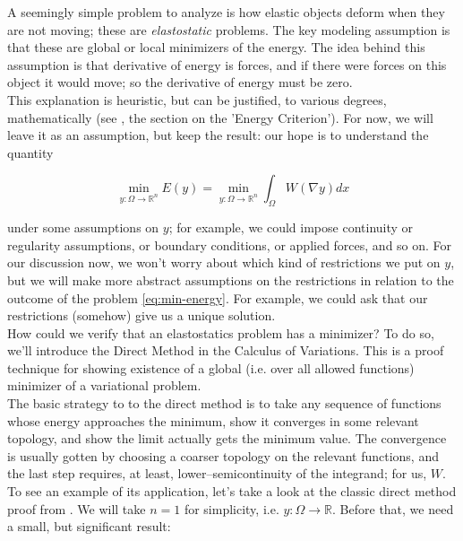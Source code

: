 \documentclass[../main.tex]{subfiles}
\begin{document}
A seemingly simple problem to analyze is how elastic objects deform when they are not moving; these are \emph{elastostatic} problems.
The key modeling assumption is that these are global or local minimizers of the energy.
The idea behind this assumption is that derivative of energy is forces, and if there were forces on this object it would move; so the derivative of energy must be zero. \\

This explanation is heuristic, but can be justified, to various degrees, mathematically (see \cite{marsden1994mathematical}, the section on the 'Energy Criterion').
For now, we will leave it as an assumption, but keep the result: our hope is to understand the quantity

\begin{equation}
	\label{eq:min-energy}
	\min_{y: \Omega \to \mathbb{R}^n} E(y) = \min_{y: \Omega \to \mathbb{R}^n} \int_{\Omega}W( \nabla y) dx
\end{equation}

under some assumptions on $y$; for example, we could impose continuity or regularity assumptions, or boundary conditions, or applied forces, and so on.
For our discussion now, we won't worry about which kind of restrictions we put on $y$, but we will make more abstract assumptions on the restrictions in relation to the outcome of the problem \eqref{eq:min-energy}.
For example, we could ask that our restrictions (somehow) give us a unique solution. \\

How could we verify that an elastostatics problem has a minimizer? To do so, we'll introduce the Direct Method in the Calculus of Variations.
This is a proof technique for showing existence of a global (i.e. over all allowed functions) minimizer  of a variational problem. \\

The basic strategy to to the direct method is to take any sequence of functions whose energy approaches the minimum, show it converges in some relevant topology, and show the limit actually gets the minimum value.
The convergence is usually gotten by choosing a coarser topology on the relevant functions, and the last step requires, at least, lower--semicontinuity of the integrand; for us, $W$.
To see an example of its application, let's take a look at the classic direct method proof from \cite{evans_partial_2010}.
We will take $n=1$ for simplicity, i.e. $y: \Omega \to \mathbb{R}$.
Before that, we need a small, but significant result:
\end{document}
